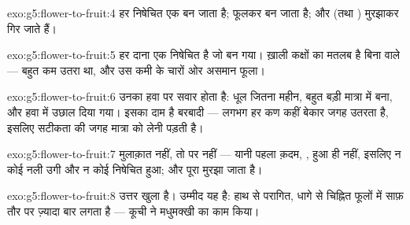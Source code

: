 \begin{solution}{exo:g5:flower-to-fruit:4}
हर निषेचित  एक  बन जाता है;  फूलकर  बन जाता है;
और  (तथा ) मुरझाकर गिर जाते हैं।
\end{solution}

\begin{solution}{exo:g5:flower-to-fruit:5}
हर दाना एक निषेचित  है जो  बन गया। ख़ाली कक्षों का मतलब है बिना
 वाले  --- बहुत कम  उतरा था, और  उस कमी के चारों ओर
असमान फूला।
\end{solution}

\begin{solution}{exo:g5:flower-to-fruit:6}
उनका  हवा पर सवार होता है: धूल जितना महीन, बहुत बड़ी मात्रा में बना,
और हवा में उछाल दिया गया। इसका दाम है बरबादी --- लगभग हर कण कहीं
बेकार जगह उतरता है, इसलिए सटीकता की जगह मात्रा को लेनी पड़ती है।
\end{solution}

\begin{solution}{exo:g5:flower-to-fruit:7}
मुलाक़ात नहीं, तो  पर  नहीं --- यानी पहला क़दम, ,
हुआ ही नहीं, इसलिए न कोई नली उगी और न कोई  निषेचित हुआ; और 
पूरा मुरझा जाता है।
\end{solution}

\begin{solution}{exo:g5:flower-to-fruit:8}
उत्तर खुला है। उम्मीद यह है: हाथ से परागित, धागे से चिह्नित फूलों में
साफ़ तौर पर ज़्यादा बार  लगता है --- कूची ने मधुमक्खी का काम किया।
\end{solution}

